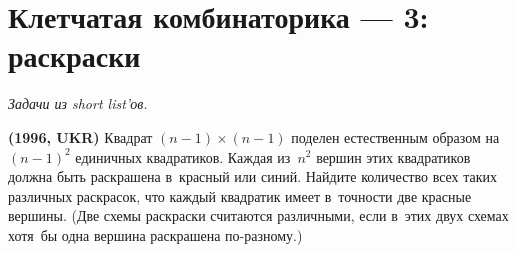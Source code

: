
\section*{Клетчатая комбинаторика --- 3: раскраски}


\begingroup
\providecommand\ifincludesolutions{\iffalse}


\emph{Задачи из short list'ов.}

\ifincludesolutions
\textbf{Версия с решениями.}
\emph{Решения являются слабообработанным переводом с~английского.
Beware!}
\fi

\begin{problems}

\item\textbf{(1996, UKR)}
Квадрат $(n - 1) \times (n - 1)$ поделен естественным образом на~$(n - 1)^2$
единичных квадратиков.
Каждая из~$n^2$ вершин этих квадратиков должна быть раскрашена в~красный или
синий.
Найдите количество всех таких различных раскрасок, что каждый квадратик имеет
в~точности две красные вершины.
(Две схемы раскраски считаются различными, если в~этих двух схемах хотя~бы одна
вершина раскрашена по-разному.)

\end{problems}

\ifincludesolutions
Пусть вершинам в~нижнем ряду присвоена произвольная раскраска, и~предположим,
что некоторые две смежные вершины получили одинаковый цвет.
Количество подобных раскрасок равно $(2^n - 2)$.
Несложно увидеть, что тогда цвета оставшихся вершин получаются заданными
единственными образом, чтобы удовлетворить требованию.
Таким образом, в~этом случае $(2^n - 2)$ возможных раскрасок.
\par
Далее, предположим, что вершины в~нижнем ряду раскрашены попеременно в~красный
и~синий.
Существует две подобных раскраски.
В~этом случае,то~же должно выполняться для каждого ряда, и~отсюда мы~получаем
$2^n$ возможных раскрасок.
\par
Отсюда следует, что полное число рассматриваемых раскрасок
$(2^n - 2) + 2^n = (2^{n+1} - 2)$.
\fi %

